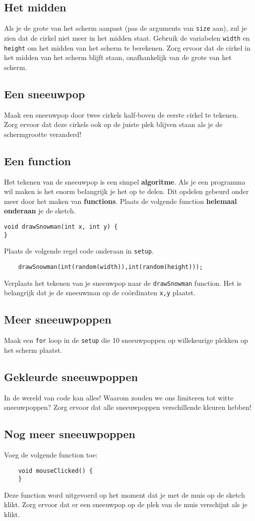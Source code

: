 \subsection{Het midden}
Als je de grote van het scherm aanpast (pas de arguments van \texttt{size} aan), zul je zien dat de cirkel niet meer in het midden staat.
Gebruik de variabelen \texttt{width} en \texttt{height} om het midden van het scherm te berekenen. Zorg ervoor dat de cirkel in het midden van het scherm blijft staan, onafhankelijk van de grote van het scherm.
\subsection{Een sneeuwpop}
Maak een sneeuwpop door twee cirkels half-boven de eerste cirkel te tekenen. Zorg ervoor dat deze cirkels ook op de juiste plek blijven staan als je de schermgrootte veranderd!
\subsection{Een function}
Het tekenen van de sneeuwpop is een simpel \textbf{algoritme}. Als je een programma wil maken is het enorm belangrijk je het op te delen. Dit opdelen gebeurd onder meer door het maken van \textbf{functions}. Plaats de volgende function \textbf{helemaal onderaan} je de sketch.
\begin{lstlisting}
void drawSnowman(int x, int y) {
}
\end{lstlisting}
Plaats de volgende regel code onderaan in \texttt{setup}.
\begin{lstlisting}
    drawSnowman(int(random(width)),int(random(height)));
\end{lstlisting}
Verplaats het tekenen van je sneeuwpop naar de \texttt{drawSnowman} function. Het is belangrijk dat je de sneeuwman op de co\"ordinaten \texttt{x,y} plaatst.

\subsection{Meer sneeuwpoppen}
Maak een \texttt{for} loop in de \texttt{setup} die 10 sneeuwpoppen op willekeurige plekken op het scherm plaatst.
\subsection{Gekleurde sneeuwpoppen}
In de wereld van code kan alles! Waarom zouden we ons limiteren tot witte sneeuwpoppen?
Zorg ervoor dat alle sneeuwpoppen verschillende kleuren hebben!
\subsection{Nog meer sneeuwpoppen}
Voeg de volgende function toe:
\begin{lstlisting}
    void mouseClicked() {
    }
\end{lstlisting}
Deze function word uitgevoerd op het moment dat je met de muis op de sketch klikt. Zorg ervoor dat er een sneeuwpop op de plek van de muis verschijnt als je klikt. 
